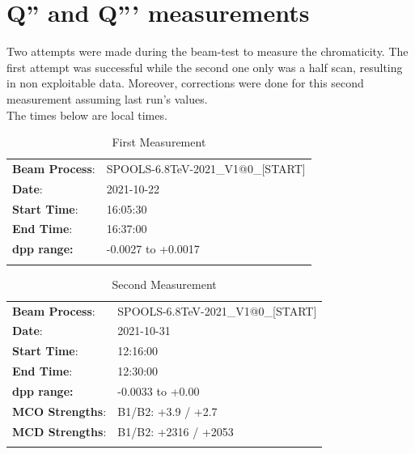 \documentclass[a4paper]{cernatsnote}
\begin{document}
\clearpage
\section{Q'' and Q''' measurements}

Two attempts were made during the beam-test to measure the chromaticity. The first attempt was successful while the second one only was a half scan, resulting in non exploitable data. Moreover, corrections were done for this second measurement assuming last run's values.\\
The times below are local times.

\begin{longtable}[h]{l l}
  \toprule
  \textbf{Beam Process}: & SPOOLS-6.8TeV-2021\_V1@0\_[START]\\
  \textbf{Date}: & 2021-10-22 \\
  \textbf{Start Time}: & 16:05:30\\
  \textbf{End Time}: & 16:37:00\\
  \textbf{dpp range:} & -0.0027 to +0.0017 \\
  \bottomrule
  \caption{First Measurement}
\end{longtable}

\begin{longtable}[h]{l l}
  \toprule
  \textbf{Beam Process}: & SPOOLS-6.8TeV-2021\_V1@0\_[START]\\
  \textbf{Date}: & 2021-10-31\\
  \textbf{Start Time}: & 12:16:00\\
  \textbf{End Time}: & 12:30:00 \\
  \textbf{dpp range:} & -0.0033 to +0.00\\
  \midrule
  \textbf{MCO Strengths}: & B1/B2: +3.9 / +2.7 \\
  \textbf{MCD Strengths}: & B1/B2: +2316 / +2053 \\
  \bottomrule
  \caption{Second Measurement}
\end{longtable}
\end{document}
